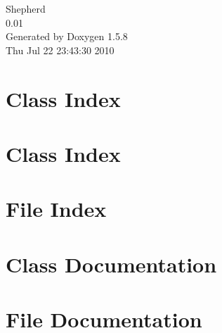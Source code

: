 \documentclass[a4paper]{book}
\begin{document}
\begin{titlepage}
\vspace*{7cm}
\begin{center}
{\Large Shepherd \\[1ex]\large 0.01 }\\
\vspace*{1cm}
{\large Generated by Doxygen 1.5.8}\\
\vspace*{0.5cm}
{\small Thu Jul 22 23:43:30 2010}\\
\end{center}
\end{titlepage}
\clearemptydoublepage
{}
\tableofcontents
\clearemptydoublepage
{}
\chapter{Class Index}

\chapter{Class Index}

\chapter{File Index}

\chapter{Class Documentation}








\chapter{File Documentation}


















\printindex
\end{document}
